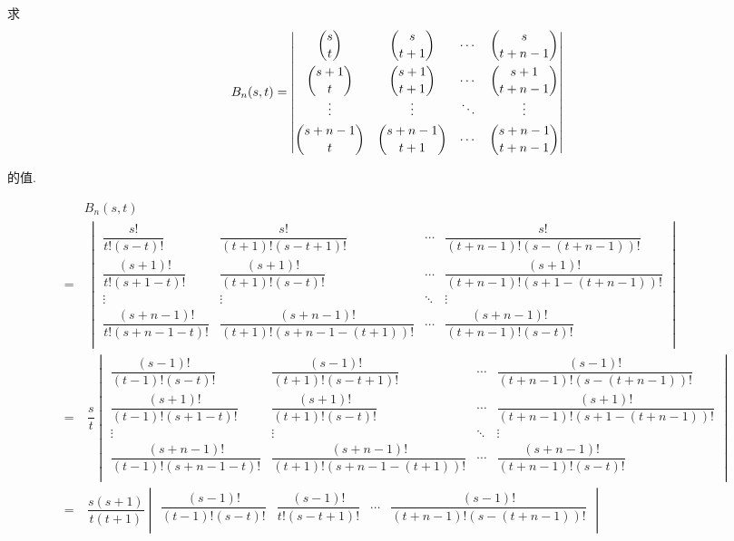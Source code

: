 \documentclass{ctexart}
\begin{document}
\begin{exercise}[2.5]
    求
    \[B_n(s,t)=\begin{vmatrix}
        \dbinom{s}{t} & \dbinom{s}{t+1} & \cdots & \dbinom{s}{t+n-1} \\[10pt]
        \dbinom{s+1}{t} & \dbinom{s+1}{t+1} & \cdots & \dbinom{s+1}{t+n-1} \\
        \vdots & \vdots & \ddots & \vdots \\[4pt]
        \dbinom{s+n-1}{t} & \dbinom{s+n-1}{t+1} & \cdots & \dbinom{s+n-1}{t+n-1} \\
    \end{vmatrix}\]

    的值.
\end{exercise}
\begin{solution}
    \begin{align*}
        & B_n(s,t) \\
        = & \ \begin{vmatrix}
            \dfrac{s!}{t!(s-t)!} & \dfrac{s!}{(t+1)!(s-t+1)!} & \cdots & \dfrac{s!}{(t+n-1)!(s-(t+n-1))!} \\[10pt]
            \dfrac{(s+1)!}{t!(s+1-t)!} & \dfrac{(s+1)!}{(t+1)!(s-t)!} & \cdots & \dfrac{(s+1)!}{(t+n-1)!(s+1-(t+n-1))!} \\
            \vdots & \vdots & \ddots & \vdots \\[4pt]
            \dfrac{(s+n-1)!}{t!(s+n-1-t)!} & \dfrac{(s+n-1)!}{(t+1)!(s+n-1-(t+1))!} & \cdots & \dfrac{(s+n-1)!}{(t+n-1)!(s-t)!} \\
        \end{vmatrix} \\
        = & \ \dfrac{s}{t}\begin{vmatrix}
            \dfrac{(s-1)!}{(t-1)!(s-t)!} & \dfrac{(s-1)!}{(t+1)!(s-t+1)!} & \cdots & \dfrac{(s-1)!}{(t+n-1)!(s-(t+n-1))!} \\[10pt]
            \dfrac{(s+1)!}{(t-1)!(s+1-t)!} & \dfrac{(s+1)!}{(t+1)!(s-t)!} & \cdots & \dfrac{(s+1)!}{(t+n-1)!(s+1-(t+n-1))!} \\
            \vdots & \vdots & \ddots & \vdots \\[4pt]
            \dfrac{(s+n-1)!}{(t-1)!(s+n-1-t)!} & \dfrac{(s+n-1)!}{(t+1)!(s+n-1-(t+1))!} & \cdots & \dfrac{(s+n-1)!}{(t+n-1)!(s-t)!} \\
        \end{vmatrix} \\
        = & \ \dfrac{s(s+1)}{t(t+1)}\begin{vmatrix}
            \dfrac{(s-1)!}{(t-1)!(s-t)!} & \dfrac{(s-1)!}{t!(s-t+1)!} & \cdots & \dfrac{(s-1)!}{(t+n-1)!(s-(t+n-1))!} \\[10pt]

\end{vmatrix}
\end{align*}
\end{solution}
\end{document}
